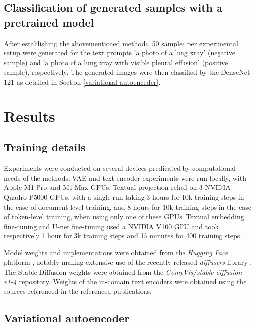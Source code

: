 \documentclass{article}
\begin{document}
\subsection{Classification of generated samples with a pretrained model}
After establishing the abovementioned methods, 50 samples per experimental setup were generated for the text prompts 'a photo of a lung xray' (negative sample) and 'a photo of a lung xray with visible pleural effusion' (positive sample), respectively. The generated images were then classified by the DenseNet-121 as detailed in Section \ref{variational-autoencoder}.

\section{Results}

\subsection{Training details}

Experiments were conducted on several devices predicated by computational needs of the methods. VAE and text encoder experiments were run locally, with Apple M1 Pro and M1 Max GPUs. Textual projection relied on 3 NVIDIA Quadro P5000 GPUs, with a single run taking 3 hours for 10k training steps in the case of document-level training, and 8 hours for 10k training steps in the case of token-level training, when using only one of these GPUs. Textual embedding fine-tuning and U-net fine-tuning used a NVIDIA V100 GPU and took respectively 1 hour for 3k training steps and 15 minutes for 400 training steps.

Model weights and implementations were obtained from the \textit{Hugging Face} platform \citep{https://doi.org/10.48550/arxiv.1910.03771}, notably making extensive use of the recently released \textit{diffusers} library \citep{von-platen-etal-2022-diffusers}. The Stable Diffusion weights were obtained from the \textit{CompVis/stable-diffusion-v1-4} repository. Weights of the in-domain text encoders were obtained using the sources referenced in the referenced publications.

\subsection{Variational autoencoder}
\end{document}
